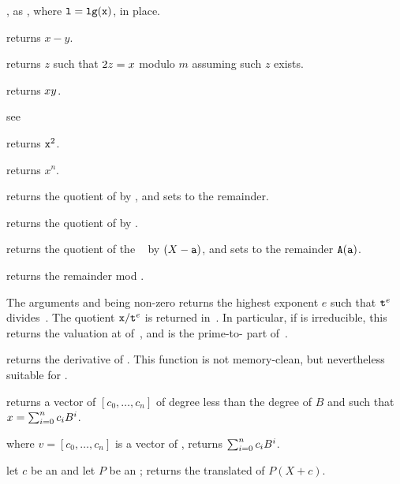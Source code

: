 , as , where
${\tt l} = {\tt lg(x)}$, in place.

 returns $x-y$.

 returns $z$ such that $2\*z = x$ modulo
$m$ assuming such $z$ exists.

 returns $x\*y$.

see 

 returns ${\tt x}^2$.

 returns $x^n$.

 returns the quotient
of  by , and sets  to the remainder.

 returns the quotient of  by
.

 returns the
quotient of the ~ by $(X - {\tt a})$, and sets  to the
remainder ${\tt A}({\tt a})$.

 returns the remainder  mod
.

 The arguments  and
 being non-zero  returns the highest exponent $e$ such that
${\tt t}^{e}$ divides~. The quotient ${\tt x}/{\tt t}^{e}$ is returned
in~. In particular, if  is irreducible, this returns the
valuation at  of~, and  is the prime-to- part
of~.

 returns the derivative of .
This function is not memory-clean, but nevertheless suitable for
.

 returns a vector of 
$[c_0,\ldots,c_n]$ of degree less than the degree of $B$ and such that
$x=\sum_{i=0}^{n}{c_i\*B^i}$.

 where $v=[c_0,\ldots,c_n]$
is a vector of , returns $\sum_{i=0}^{n}{c_i\*B^i}$.

 let $c$ be an  and let
$P$ be an ; returns the translated  of $P(X+c)$.

